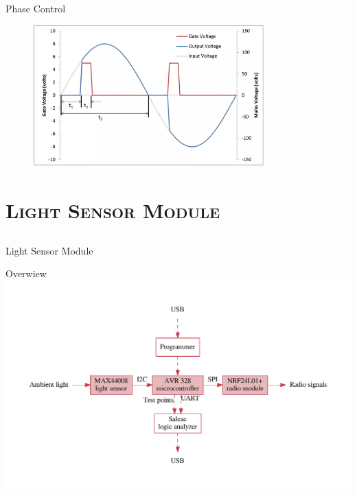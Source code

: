 	\begin{frame}{Phase Control}
		
		\begin{figure}[ht!]
			\centering
			\includegraphics[width=0.8\textwidth]{Phase.png}
			\label{fig:circuit}
		\end{figure} 
		
	\end{frame}

	
	\section{\scshape Light Sensor Module}
	\subsection{}
   \begin{frame}
      \Huge{\centerline{Light Sensor Module}}
   \end{frame}

	\begin{frame}{Overwiew}
      \center
      \includegraphics[width=1.1\textwidth]{sensorFlow.pdf}
	\end{frame}

